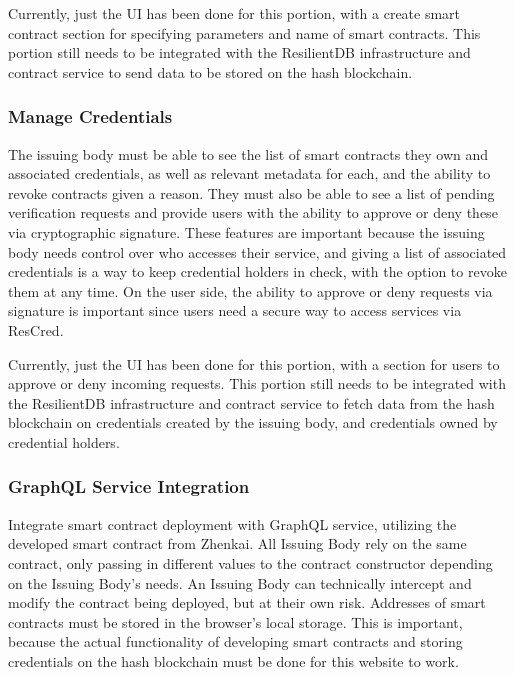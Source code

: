 Currently, just the UI has been done for this portion, with a create smart contract section for specifying parameters and name of smart contracts. This portion still needs to be integrated with the ResilientDB infrastructure and contract service to send data to be stored on the hash blockchain. 

\subsubsection{Manage Credentials}

The issuing body must be able to see the list of smart contracts they own and associated credentials, as well as relevant metadata for each, and the ability to revoke contracts given a reason. They must also be able to see a list of pending verification requests and provide users with the ability to approve or deny these via cryptographic signature. These features are important because the issuing body needs control over who accesses their service, and giving a list of associated credentials is a way to keep credential holders in check, with the option to revoke them at any time. On the user side, the ability to approve or deny requests via signature is important since users need a secure way to access services via ResCred.

Currently, just the UI has been done for this portion, with a section for users to approve or deny incoming requests. This portion still needs to be integrated with the ResilientDB infrastructure and contract service to fetch data from the hash blockchain on credentials created by the issuing body, and credentials owned by credential holders.

\subsubsection{GraphQL Service Integration}

Integrate smart contract deployment with GraphQL service, utilizing the developed smart contract from Zhenkai. All Issuing Body rely on the same contract, only passing in different values to the contract constructor depending on the Issuing Body’s needs. An Issuing Body can technically intercept and modify the contract being deployed, but at their own risk. Addresses of smart contracts must be stored in the browser's local storage. This is important, because the actual functionality of developing smart contracts and storing credentials on the hash blockchain must be done for this website to work.


